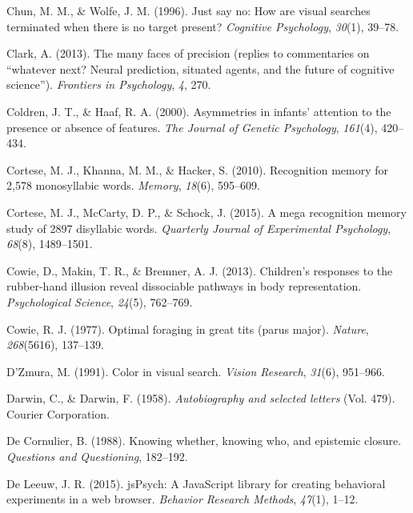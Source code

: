 \documentclass[12pt,twoside]{reedthesis}
\newenvironment{CSLReferences}%
  {}%
  {\par}
\begin{document}
\begin{CSLReferences}{1}{0}
\leavevmode\hypertarget{ref-chun1996just}{}%
Chun, M. M., \& Wolfe, J. M. (1996). Just say no: How are visual searches terminated when there is no target present? \emph{Cognitive Psychology}, \emph{30}(1), 39--78.

\leavevmode\hypertarget{ref-clark2013many}{}%
Clark, A. (2013). The many faces of precision (replies to commentaries on {``whatever next? Neural prediction, situated agents, and the future of cognitive science''}). \emph{Frontiers in Psychology}, \emph{4}, 270.

\leavevmode\hypertarget{ref-coldren2000asymmetries}{}%
Coldren, J. T., \& Haaf, R. A. (2000). Asymmetries in infants' attention to the presence or absence of features. \emph{The Journal of Genetic Psychology}, \emph{161}(4), 420--434.

\leavevmode\hypertarget{ref-cortese2010recognition}{}%
Cortese, M. J., Khanna, M. M., \& Hacker, S. (2010). Recognition memory for 2,578 monosyllabic words. \emph{Memory}, \emph{18}(6), 595--609.

\leavevmode\hypertarget{ref-cortese2015mega}{}%
Cortese, M. J., McCarty, D. P., \& Schock, J. (2015). A mega recognition memory study of 2897 disyllabic words. \emph{Quarterly Journal of Experimental Psychology}, \emph{68}(8), 1489--1501.

\leavevmode\hypertarget{ref-cowie2013children}{}%
Cowie, D., Makin, T. R., \& Bremner, A. J. (2013). Children's responses to the rubber-hand illusion reveal dissociable pathways in body representation. \emph{Psychological Science}, \emph{24}(5), 762--769.

\leavevmode\hypertarget{ref-cowie1977optimal}{}%
Cowie, R. J. (1977). Optimal foraging in great tits (parus major). \emph{Nature}, \emph{268}(5616), 137--139.

\leavevmode\hypertarget{ref-d1991color}{}%
D'Zmura, M. (1991). Color in visual search. \emph{Vision Research}, \emph{31}(6), 951--966.

\leavevmode\hypertarget{ref-darwin1958autobiography}{}%
Darwin, C., \& Darwin, F. (1958). \emph{Autobiography and selected letters} (Vol. 479). Courier Corporation.

\leavevmode\hypertarget{ref-de1988knowing}{}%
De Cornulier, B. (1988). Knowing whether, knowing who, and epistemic closure. \emph{Questions and Questioning}, 182--192.

\leavevmode\hypertarget{ref-de2015jspsych}{}%
De Leeuw, J. R. (2015). jsPsych: A JavaScript library for creating behavioral experiments in a web browser. \emph{Behavior Research Methods}, \emph{47}(1), 1--12.


\end{CSLReferences}
\end{document}
